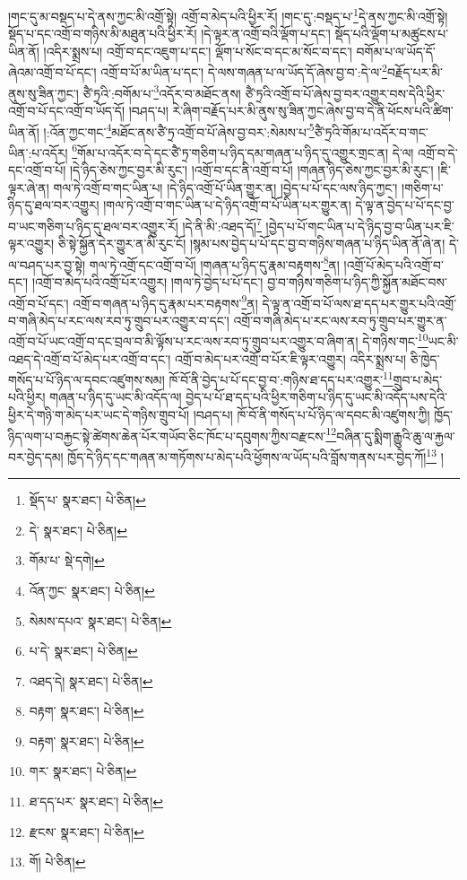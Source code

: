 །གང་དུ་མ་བསྡད་པ་དེ་ནས་ཀྱང་མི་འགྲོ་སྟེ། འགྲོ་བ་མེད་པའི་ཕྱིར་རོ། །གང་དུ་:བསྡད་པ་\footnote{སྡོད་པ་  སྣར་ཐང་།  པེ་ཅིན། }དེ་ནས་ཀྱང་མི་འགྲོ་སྟེ། སྡོད་པ་དང་འགྲོ་བ་གཉིས་མི་མཐུན་པའི་ཕྱིར་རོ། །དེ་ལྟར་ན་འགྲོ་བའི་ལྡོག་པ་དང་། སྡོད་པའི་ལྡོག་པ་མཚུངས་པ་ཡིན་ནོ། །འདིར་སྨྲས་པ། འགྲོ་བ་དང་འཇུག་པ་དང་། ལྡོག་པ་སོང་བ་དང་མ་སོང་བ་དང་། བགོམ་པ་ལ་ཡོད་དོ་ཞེའམ་འགྲོ་བ་པོ་དང་། འགྲོ་བ་པོ་མ་ཡིན་པ་དང་། དེ་ལས་གཞན་པ་ལ་ཡོད་དོ་ཞེས་བྱ་བ་:དེ་ལ་\footnote{དེ་  སྣར་ཐང་།  པེ་ཅིན། }བརྗོད་པར་མི་ནུས་སུ་ཟིན་ཀྱང་། ཙཻ་ཏྲའི་:བགོམ་པ་\footnote{གོམ་པ་  སྡེ་དགེ། }འདོར་བ་མཐོང་ནས། ཙཻ་ཏྲའི་འགྲོ་བ་པོ་ཞེས་བྱ་བར་འགྱུར་བས་དེའི་ཕྱིར་འགྲོ་བ་པོ་དང་འགྲོ་བ་ཡོད་དོ། །བཤད་པ། རེ་ཞིག་བརྗོད་པར་མི་ནུས་སུ་ཟིན་ཀྱང་ཞེས་བྱ་བ་དེ་ནི་ཕོངས་པའི་ཚིག་ཡིན་ནོ། །:འོན་ཀྱང་གང་\footnote{འོན་ཀྱང་  སྣར་ཐང་།  པེ་ཅིན། }མཐོང་ནས་ཙཻ་ཏྲ་འགྲོ་བ་པོ་ཞེས་བྱ་བར་:སེམས་པ་\footnote{སེམས་དཔའ་  སྣར་ཐང་།  པེ་ཅིན། }ཙཻ་ཏྲའི་གོམ་པ་འདོར་བ་གང་ཡིན་:པ་འདོར། \footnote{པ་དེ་  སྣར་ཐང་།  པེ་ཅིན། }གོམ་པ་འདོར་བ་དེ་དང་ཙཻ་ཏྲ་གཅིག་པ་ཉིད་དམ་གཞན་པ་ཉིད་དུ་འགྱུར་གྲང་ན། དེ་ལ། འགྲོ་བ་དེ་དང་འགྲོ་བ་པོ། །དེ་ཉིད་ཅེས་ཀྱང་བྱར་མི་རུང་། །འགྲོ་བ་དང་ནི་འགྲོ་བ་པོ། །གཞན་ཉིད་ཅེས་ཀྱང་བྱར་མི་རུང་། །ཇི་ལྟར་ཞེ་ན། གལ་ཏེ་འགྲོ་བ་གང་ཡིན་པ། །དེ་ཉིད་འགྲོ་པོ་ཡིན་གྱུར་ན། །བྱེད་པ་པོ་དང་ལས་ཉིད་ཀྱང་། །གཅིག་པ་ཉིད་དུ་ཐལ་བར་འགྱུར། །གལ་ཏེ་འགྲོ་བ་གང་ཡིན་པ་དེ་ཉིད་འགྲོ་བ་པོ་ཡིན་པར་གྱུར་ན། དེ་ལྟ་ན་བྱེད་པ་པོ་དང་བྱ་བ་ཡང་གཅིག་པ་ཉིད་དུ་ཐལ་བར་འགྱུར་རོ། །དེ་ནི་མི་:འཐད་དོ།\footnote{འཐད་དེ།  སྣར་ཐང་།  པེ་ཅིན། } །བྱེད་པ་པོ་གང་ཡིན་པ་དེ་ཉིད་བྱ་བ་ཡིན་པར་ཇི་ལྟར་འགྱུར། ཅི་སྟེ་སྐྱོན་དེར་གྱུར་ན་མི་རུང་ངོ། །སྙམ་པས་བྱེད་པ་པོ་དང་བྱ་བ་གཉིས་གཞན་པ་ཉིད་ཡིན་ནོ་ཞེ་ན། དེ་ལ་བཤད་པར་བྱ་སྟེ། གལ་ཏེ་འགྲོ་དང་འགྲོ་བ་པོ། །གཞན་པ་ཉིད་དུ་རྣམ་བརྟགས་\footnote{བརྟག་  སྣར་ཐང་།  པེ་ཅིན། }ན། །འགྲོ་པོ་མེད་པའི་འགྲོ་བ་དང་། །འགྲོ་བ་མེད་པའི་འགྲོ་པོར་འགྱུར། །གལ་ཏེ་བྱེད་པ་པོ་དང་། བྱ་བ་གཉིས་གཅིག་པ་ཉིད་ཀྱི་སྐྱོན་མཐོང་བས་འགྲོ་བ་པོ་དང་། འགྲོ་བ་གཞན་པ་ཉིད་དུ་རྣམ་པར་བརྟགས་\footnote{བརྟག་  སྣར་ཐང་།  པེ་ཅིན། }ན། དེ་ལྟ་ན་འགྲོ་བ་པོ་ལས་ཐ་དད་པར་གྱུར་པའི་འགྲོ་བ་གཞི་མེད་པ་རང་ལས་རབ་ཏུ་གྲུབ་པར་འགྱུར་བ་དང་། འགྲོ་བ་གཞི་མེད་པ་རང་ལས་རབ་ཏུ་གྲུབ་པར་གྱུར་ན་འགྲོ་བ་པོ་ཡང་འགྲོ་བ་དང་བྲལ་བ་མི་ལྟོས་པ་རང་ལས་རབ་ཏུ་གྲུབ་པར་འགྱུར་བ་ཞིག་ན། དེ་གཉིས་གང་\footnote{གར་  སྣར་ཐང་།  པེ་ཅིན། }ཡང་མི་འཐད་དེ་འགྲོ་བ་པོ་མེད་པར་འགྲོ་བ་དང་། འགྲོ་བ་མེད་པར་འགྲོ་བ་པོར་ཇི་ལྟར་འགྱུར། འདིར་སྨྲས་པ། ཅི་ཁྱེད་གསོད་པ་པོ་ཉིད་ལ་དབང་འཛུགས་སམ། ཁོ་བོ་ནི་བྱེད་པ་པོ་དང་བྱ་བ་:གཉིས་ཐ་དད་པར་འགྱུར་\footnote{ཐ་དད་པར་  སྣར་ཐང་།  པེ་ཅིན། }གྲུབ་པ་མེད་པའི་ཕྱིར། གཞན་པ་ཉིད་དུ་ཡང་མི་འདོད་ལ། བྱེད་པ་པོ་ཐ་དད་པའི་ཕྱིར་གཅིག་པ་ཉིད་དུ་ཡང་མི་འདོད་པས་དེའི་ཕྱིར་དེ་གཉི་ག་མེད་པར་ཡང་དེ་གཉིས་གྲུབ་པོ། །བཤད་པ། ཁོ་བོ་ནི་གསོད་པ་པོ་ཉིད་ལ་དབང་མི་འཛུགས་ཀྱི། ཁྱོད་ཉིད་ལག་པ་བརྐྱང་སྟེ་ཚེགས་ཆེན་པོར་གཡོབ་ཅིང་ཁོང་པ་དབུགས་ཀྱིས་བརྫངས་\footnote{རྫངས་  སྣར་ཐང་།  པེ་ཅིན། }བཞིན་དུ་སྨིག་རྒྱུའི་ཆུ་ལ་རྐྱལ་བར་བྱེད་དམ། ཁྱོད་དེ་ཉིད་དང་གཞན་མ་གཏོགས་པ་མེད་པའི་ཕྱོགས་ལ་ཡོད་པའི་བློས་གནས་པར་བྱེད་ཀོ།\footnote{གོ།  པེ་ཅིན། } །
